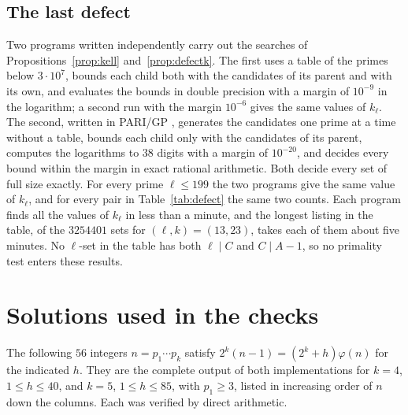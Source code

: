 \documentclass[11pt,reqno]{amsart}
\numberwithin{equation}{section}
\theoremstyle{plain}
\theoremstyle{definition}
\theoremstyle{remark}
\begin{document}
\subsection{The last defect}\label{app:defect}
Two programs written independently carry out the searches of
Propositions~\ref{prop:kell} and~\ref{prop:defectk}. The first uses a
table of the primes below $3\cdot10^7$, bounds each child both with the
candidates of its parent and with its own, and evaluates the bounds in
double precision with a margin of $10^{-9}$ in the logarithm; a second
run with the margin $10^{-6}$ gives the same values of $k_\ell$. The
second, written in PARI/GP \cite{PARI}, generates the candidates one
prime at a time without a table, bounds each child only with the
candidates of its parent, computes the logarithms to $38$ digits with a
margin of $10^{-20}$, and decides every bound within the margin in
exact rational arithmetic. Both decide every set of full size exactly.
For every prime $\ell\le199$ the two programs give the same value of
$k_\ell$, and for every pair in Table~\ref{tab:defect} the same two
counts. Each program finds all the values of $k_\ell$ in less than
a minute, and the longest listing in the table, of the $3254401$ sets
for $(\ell,k)=(13,23)$, takes each of them about five minutes. No $\ell$-set in the table has both $\ell\mid C$ and
$C\mid A-1$, so no primality test enters these results.

\section{Solutions used in the checks}\label{app:known}

The following $56$ integers $n=p_1\cdots p_k$ satisfy
$2^k(n-1)=(2^k+h)\varphi(n)$ for the indicated $h$. They are the
complete output of both implementations for $k=4$, $1\le h\le40$, and
$k=5$, $1\le h\le85$, with $p_1\ge3$, listed in increasing order of
$n$ down the columns. Each was verified by direct arithmetic.
\end{document}
